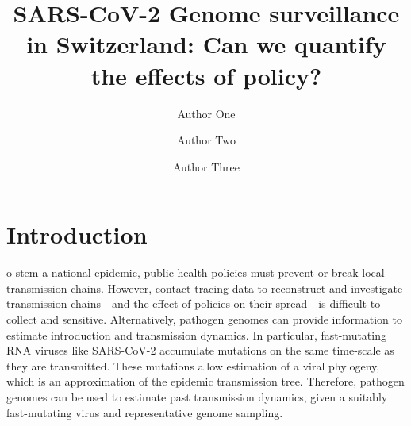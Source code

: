 \documentclass[9pt,twocolumn,twoside,lineno]{pnas-new}
\title{SARS-CoV-2 Genome surveillance in Switzerland: Can we quantify the effects of policy?}
\author[a,c,1]{Author One}
\author[b,1,2]{Author Two}
\author[a]{Author Three}
\affil[a]{Affiliation One}
\affil[b]{Affiliation Two}
\affil[c]{Affiliation Three}
\begin{document}
\maketitle
\thispagestyle{firststyle}



\section{Introduction}

o stem a national epidemic, public health policies must prevent or break local transmission chains. However, contact tracing data to reconstruct and investigate transmission chains - and the effect of policies on their spread - is difficult to collect and sensitive. Alternatively, pathogen genomes can provide information to estimate introduction and transmission dynamics. In particular, fast-mutating RNA viruses like SARS-CoV-2 accumulate mutations on the same time-scale as they are transmitted. These mutations allow estimation of a viral phylogeny, which is an approximation of the epidemic transmission tree. Therefore, pathogen genomes can be used to estimate past transmission dynamics, given a suitably fast-mutating virus and representative genome sampling.
\end{document}
